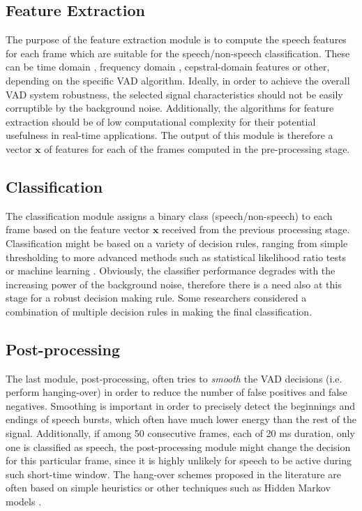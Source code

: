 \subsection{Feature Extraction}

The purpose of the feature extraction module is to compute the speech features for each frame which are suitable for the speech/non-speech classification. These can be time domain \cite{Kida, Weaver}, frequency domain \cite{Tuske, LTSD, Tan, PARADE, RamirezMulti, Sohn, SohnInitial, Renevey}, cepstral-domain \cite{Kotcher} features or other, depending on the specific VAD algorithm. Ideally, in order to achieve the overall VAD system robustness, the selected signal characteristics should not be easily corruptible by the background noise. Additionally, the algorithms for feature extraction should be of low computational complexity for their potential usefulness in real-time applications. The output of this module is therefore a vector $\mathbf{x}$ of features for each of the frames computed in the pre-processing stage.

\subsection{Classification}

The classification module assigns a binary class (speech/non-speech) to each frame based on the feature vector $\mathbf{x}$ received from the previous processing stage. Classification might be based on a variety of decision rules, ranging from simple thresholding \cite{G729} to more advanced methods such as statistical likelihood ratio tests \cite{Sohn, ImprovedLikelihood, SohnInitial} or machine learning \cite{XiaoLei, Stadtschnitzer}. Obviously, the classifier performance degrades with the increasing power of the background noise, therefore there is a need also at this stage for a robust decision making rule. Some researchers \cite{Kida} considered a combination of multiple decision rules in making the final classification.

\subsection{Post-processing}

The last module, post-processing, often tries to \emph{smooth} the VAD decisions (i.e. perform hanging-over) in order to reduce the number of false positives and false negatives. Smoothing is important in order to precisely detect the beginnings and endings of speech bursts, which often have much lower energy than the rest of the signal. Additionally, if among 50 consecutive frames, each of 20 ms duration, only one is classified as speech, the post-processing module might change the decision for this particular frame, since it is highly unlikely for speech to be active during such short-time window. The hang-over schemes  proposed in the literature are often based on simple heuristics \cite{G729} or other techniques such as Hidden Markov models \cite{Sohn}.

